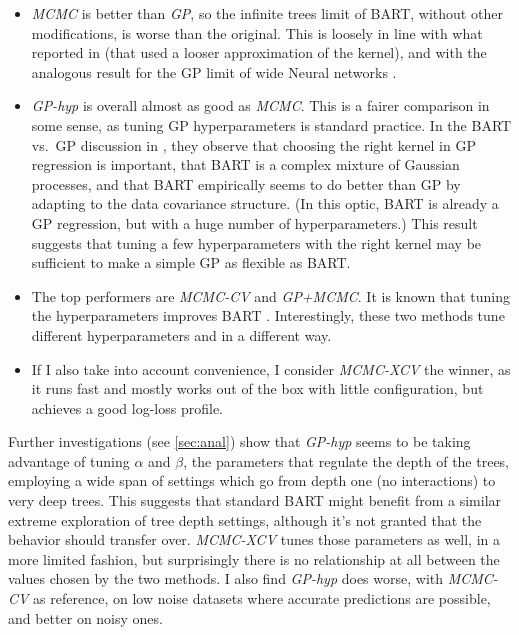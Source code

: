 \documentclass[a4paper]{article}
\theoremstyle{definition}
\let\oldmarginpar\marginpar
\renewcommand{\marginpar}[1]{\oldmarginpar{\sffamily\scriptsize #1}}
\renewcommand{\marginpar}[1]{\relax} %
\begin{document}
    \begin{itemize}
        \item \emph{MCMC} is better than \emph{GP}, so the infinite trees limit of BART, without other modifications, is worse than the original. This is loosely in line with what reported in \textcite[\S5.2, p.~554]{linero2017} (that used a looser approximation of the kernel), and with the analogous result for the GP limit of wide Neural networks \autocite[\S5]{arora2019}.

        \item \emph{GP-hyp} is overall almost as good as \emph{MCMC}. This is a fairer comparison in some sense, as tuning GP hyperparameters is standard practice. In the BART vs.\ GP discussion in \textcite[1052]{hahn2020}, they observe that choosing the right kernel in GP regression is important, that BART is a complex mixture of Gaussian processes, and that BART empirically seems to do better than GP by adapting to the data covariance structure. (In this optic, BART is already a GP regression, but with a huge number of hyperparameters.) This result suggests that tuning a few hyperparameters with the right kernel may be sufficient to make a simple GP as flexible as BART.

        \item The top performers are \emph{MCMC-CV} and \emph{GP+MCMC}. It is known that tuning the hyperparameters improves BART \autocites[fig.~2]{chipman2010}[18]{imai2022}[445]{imai2013}[\S5.4 p.~55, \S6.2 p.~58]{dorie2019}.\marginpar{Here I'd like to cite the published imai2024 instead of the arxiv imai2022, but I can't access the published version so nope.} Interestingly, these two methods tune different hyperparameters and in a different way.

        \item If I also take into account convenience, I consider \emph{MCMC-XCV} the winner, as it runs fast and mostly works out of the box with little configuration, but achieves a good log-loss profile.
    \end{itemize}

    Further investigations (see \autoref{sec:anal}) show that \emph{GP-hyp} seems to be taking advantage of tuning $\alpha$ and $\beta$, the parameters that regulate the depth of the trees, employing a wide span of settings which go from depth one (no interactions) to very deep trees. This suggests that standard BART might benefit from a similar extreme exploration of tree depth settings, although it's not granted that the behavior should transfer over. \emph{MCMC-XCV} tunes those parameters as well, in a more limited fashion, but surprisingly there is no relationship at all between the values chosen by the two methods. I also find \emph{GP-hyp} does worse, with \emph{MCMC-CV} as reference, on low noise datasets where accurate predictions are possible, and better on noisy ones.
\end{document}

